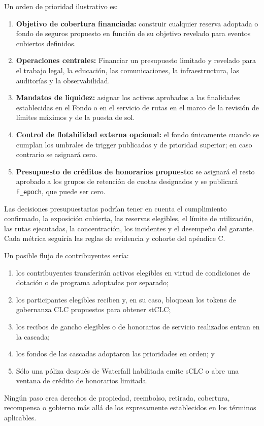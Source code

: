 \documentclass[11pt]{article}
\begin{document}
Un orden de prioridad ilustrativo es:

\begin{enumerate}[leftmargin=*]
\item \textbf{Objetivo de cobertura financiada:} construir cualquier reserva adoptada o fondo de seguros propuesto en función de su objetivo revelado para eventos cubiertos definidos.
\item \textbf{Operaciones centrales:} Financiar un presupuesto limitado y revelado para el trabajo legal, la educación, las comunicaciones, la infraestructura, las auditorías y la observabilidad.
\item \textbf{Mandatos de liquidez:} asignar los activos aprobados a las finalidades establecidas en el Fondo o en el servicio de rutas en el marco de la revisión de límites máximos y de la puesta de sol.
\item \textbf{Control de flotabilidad externa opcional:} el fondo únicamente cuando se cumplan los umbrales de trigger publicados y de prioridad superior; en caso contrario se asignará cero.
\item \textbf{Presupuesto de créditos de honorarios propuesto:} se asignará el resto aprobado a los grupos de retención de cuotas designados y se publicará \texttt{F\_epoch}, que puede ser cero.
\end{enumerate}
Las decisiones presupuestarias podrían tener en cuenta el cumplimiento confirmado, la exposición cubierta, las reservas elegibles, el límite de utilización, las rutas ejecutadas, la concentración, los incidentes y el desempeño del garante. Cada métrica seguiría las reglas de evidencia y cohorte del apéndice C.

Un posible flujo de contribuyentes sería:

\begin{enumerate}[leftmargin=*]
\item los contribuyentes transferirán activos elegibles en virtud de condiciones de dotación o de programa adoptadas por separado;
\item los participantes elegibles reciben y, en su caso, bloquean los tokens de gobernanza CLC propuestos para obtener stCLC;
\item los recibos de gancho elegibles o de honorarios de servicio realizados entran en la cascada;
\item los fondos de las cascadas adoptaron las prioridades en orden; y
\item Sólo una póliza después de Waterfall habilitada emite sCLC o abre una ventana de crédito de honorarios limitada.
\end{enumerate}
Ningún paso crea derechos de propiedad, reembolso, retirada, cobertura, recompensa o gobierno más allá de los expresamente establecidos en los términos aplicables.
\end{document}
